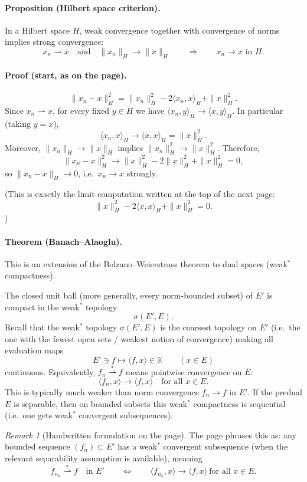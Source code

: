 \documentclass[11pt]{article}
\theoremstyle{definition}
\theoremstyle{remark}
\newtheorem{remark}{Remark}
\begin{document}
\paragraph{Proposition (Hilbert space criterion).}
In a Hilbert space $H$, weak convergence together with convergence of norms implies strong convergence:
\[
x_n \rightharpoonup x
\quad\text{and}\quad
\|x_n\|_H \to \|x\|_H
\qquad\Longrightarrow\qquad
x_n \to x \text{ in } H.
\]

\paragraph{Proof (start, as on the page).}
\[
\|x_n-x\|_H^2
=
\|x_n\|_H^2 - 2\langle x_n,x\rangle_H + \|x\|_H^2.
\]
Since $x_n \rightharpoonup x$, for every fixed $y\in H$ we have $\langle x_n,y\rangle_H\to \langle x,y\rangle_H$. In particular (taking $y=x$),
\[
\langle x_n,x\rangle_H \longrightarrow \langle x,x\rangle_H=\|x\|_H^2.
\]
Moreover, $\|x_n\|_H\to \|x\|_H$ implies $\|x_n\|_H^2\to \|x\|_H^2$. Therefore,
\[
\|x_n-x\|_H^2
\longrightarrow
\|x\|_H^2 - 2\|x\|_H^2 + \|x\|_H^2
=
0,
\]
so $\|x_n-x\|_H\to 0$, i.e.\ $x_n\to x$ strongly.

\noindent
(This is exactly the limit computation written at the top of the next page:
\[
\|x\|_H^2 - 2\langle x,x\rangle_H + \|x\|_H^2 = 0.
\])

\paragraph{Theorem (Banach--Alaoglu).}
This is an extension of the Bolzano--Weierstrass theorem to dual spaces (weak$^\ast$ compactness).

The closed unit ball (more generally, every norm-bounded subset) of $E'$ is compact in the weak$^\ast$ topology
\[
\sigma(E',E).
\]
Recall that the weak$^\ast$ topology $\sigma(E',E)$ is the coarsest topology on $E'$ (i.e.\ the one with the fewest open sets / weakest notion of convergence) making all evaluation maps
\[
E'\ni f \longmapsto \langle f,x\rangle \in \mathbb{K}
\qquad (x\in E)
\]
continuous. Equivalently, $f_n\stackrel{*}{\rightharpoonup} f$ means pointwise convergence on $E$:
\[
\langle f_n,x\rangle \to \langle f,x\rangle \quad \text{for all } x\in E.
\]
This is typically much weaker than norm convergence $f_n\to f$ in $E'$.
If the predual $E$ is separable, then on bounded subsets this weak$^\ast$ compactness is sequential (i.e.\ one gets weak$^\ast$ convergent subsequences).

\begin{remark}[Handwritten formulation on the page]
The page phrases this as: any bounded sequence $(f_n)\subset E'$ has a weak$^\ast$ convergent subsequence (when the relevant separability assumption is available), meaning
\[
f_{n_k}\stackrel{*}{\rightharpoonup} f \quad \text{in } E'
\qquad\Longleftrightarrow\qquad
\langle f_{n_k},x\rangle \to \langle f,x\rangle
\ \text{for all } x\in E.
\]
\end{remark}
\end{document}
